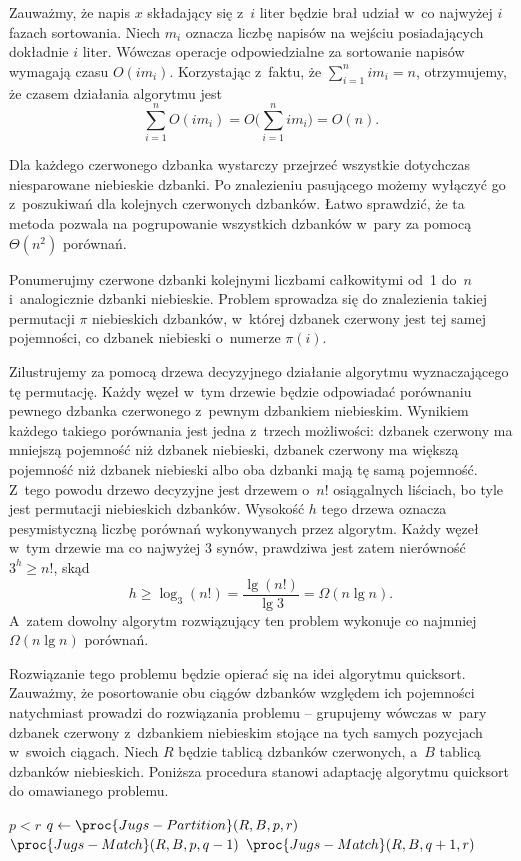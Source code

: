 Zauważmy, że napis $x$ składający się z~$i$ liter będzie brał udział w~co najwyżej $i$ fazach sortowania. Niech $m_i$ oznacza liczbę napisów na wejściu posiadających dokładnie $i$ liter. Wówczas operacje odpowiedzialne za sortowanie napisów  wymagają czasu $O(im_i)$. Korzystając z~faktu, że $\sum_{i=1}^nim_i=n$, otrzymujemy, że czasem działania algorytmu jest
\[
    \sum_{i=1}^nO(im_i) = O\biggl(\sum_{i=1}^nim_i\biggr) = O(n).
\]


\subproblem %
Dla każdego czerwonego dzbanka wystarczy przejrzeć wszystkie dotychczas niesparowane niebieskie dzbanki. Po znalezieniu pasującego możemy wyłączyć go z~poszukiwań dla kolejnych czerwonych dzbanków. Łatwo sprawdzić, że ta metoda pozwala na pogrupowanie wszystkich dzbanków w~pary za pomocą $\Theta(n^2)$ porównań.

\subproblem %
Ponumerujmy czerwone dzbanki kolejnymi liczbami całkowitymi od~1 do~$n$ i~analogicznie dzbanki niebieskie. Problem sprowadza się do znalezienia takiej permutacji $\pi$ niebieskich dzbanków, w~której  dzbanek czerwony jest tej samej pojemności, co dzbanek niebieski o~numerze $\pi(i)$.

Zilustrujemy za pomocą drzewa decyzyjnego działanie algorytmu wyznaczającego tę permutację. Każdy węzeł w~tym drzewie będzie odpowiadać porównaniu pewnego dzbanka czerwonego z~pewnym dzbankiem niebieskim. Wynikiem każdego takiego porównania jest jedna z~trzech możliwości: dzbanek czerwony ma mniejszą pojemność niż dzbanek niebieski, dzbanek czerwony ma większą pojemność niż dzbanek niebieski albo oba dzbanki mają tę samą pojemność. Z~tego powodu drzewo decyzyjne jest drzewem  o~$n!$ osiągalnych liściach, bo tyle jest permutacji niebieskich dzbanków. Wysokość $h$ tego drzewa oznacza pesymistyczną liczbę porównań wykonywanych przez algorytm. Każdy węzeł w~tym drzewie ma co najwyżej 3 synów, prawdziwa jest zatem nierówność $3^h\ge n!$, skąd
\[
	h \ge \log_3(n!) = \frac{\lg(n!)}{\lg3} = \Omega(n\lg n).
\]
A~zatem dowolny algorytm rozwiązujący ten problem wykonuje co najmniej $\Omega(n\lg n)$ porównań.

\subproblem %
Rozwiązanie tego problemu będzie opierać się na idei algorytmu quicksort. Zauważmy, że posortowanie obu ciągów dzbanków względem ich pojemności natychmiast prowadzi do rozwiązania problemu -- grupujemy wówczas w~pary dzbanek czerwony z~dzbankiem niebieskim stojące na tych samych pozycjach w~swoich ciągach. Niech $R$ będzie tablicą dzbanków czerwonych, a~$B$ tablicą dzbanków niebieskich. Poniższa procedura stanowi adaptację algorytmu quicksort do omawianego problemu.
\begin{codebox}
\li	\If $p<r$
\li		\Then
			$q\gets\proc{Jugs-Partition}(R,B,p,r)$
\li			$\proc{Jugs-Match}(R,B,p,q-1)$
\li			$\proc{Jugs-Match}(R,B,q+1,r)$
		\End
\end{codebox}

